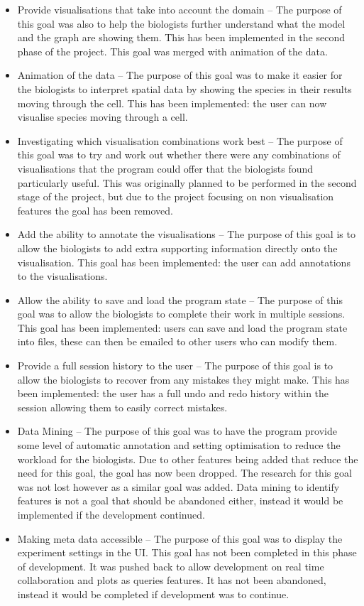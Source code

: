 \begin{itemize}
\item Provide visualisations that take into account the domain -- The purpose of this goal was also to help the biologists further understand what the model and the graph are showing them. This has been implemented in the second phase of the project.  This goal was merged with animation of the data.
\item Animation of the data -- The purpose of this goal was to make it easier for the biologists to interpret spatial data by showing the species in their results moving through the cell.  This has been implemented: the user can now visualise species moving through a cell.
\item Investigating which visualisation combinations work best -- The purpose of this goal was to try and work out whether there were any combinations of visualisations that the program could offer that the biologists found particularly useful.  This was originally planned to be performed in the second stage of the project, but due to the project focusing on non visualisation features the goal has been removed.
\item Add the ability to annotate the visualisations -- The purpose of this goal is to allow the biologists to add extra supporting information directly onto the visualisation. This goal has been implemented: the user can add annotations to the visualisations.
\item Allow the ability to save and load the program state -- The purpose of this goal was to allow the biologists to complete their work in multiple sessions. This goal has been implemented: users can save and load the program state into files, these can then be emailed to other users who can modify them.
\item Provide a full session history to the user -- The purpose of this goal is to allow the biologists to recover from any mistakes they might make. This has been implemented: the user has a full undo and redo history within the session allowing them to easily correct mistakes.
\item Data Mining -- The purpose of this goal was to have the program provide some level of automatic annotation and setting optimisation to reduce the workload for the biologists.  Due to other features being added that reduce the need for this goal, the goal has now been dropped.  The research for this goal was not lost however as a similar goal was added.  Data mining to identify features is not a goal that should be abandoned either, instead it would be implemented if the development continued.
\item Making meta data accessible -- The purpose of this goal was to display the experiment settings in the \ac{UI}.  This goal has not been completed in this phase of development.  It was pushed back to allow development on real time collaboration and plots as queries features.  It has not been abandoned, instead it would be completed if development was to continue.
\end{itemize}

